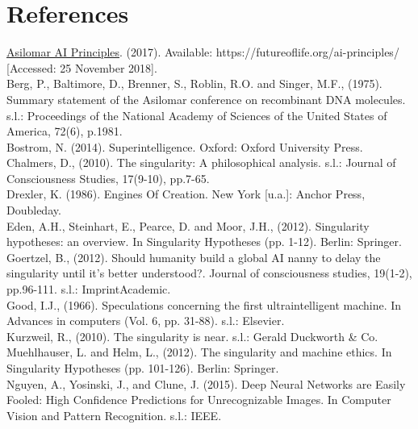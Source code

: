 \documentclass[11pt]{article}
\begin{document}
\newpage

\section*{References}

\underline{Asilomar AI Principles}. (2017). Available: https://futureoflife.org/ai-principles/ [Accessed: 25 November 2018].\\

Berg, P., Baltimore, D., Brenner, S., Roblin, R.O. and Singer, M.F., (1975). Summary statement of the Asilomar conference on recombinant DNA molecules. s.l.: Proceedings of the National Academy of Sciences of the United States of America, 72(6), p.1981.\\

Bostrom, N. (2014). Superintelligence. Oxford: Oxford University Press.\\

Chalmers, D., (2010). The singularity: A philosophical analysis. s.l.: Journal of Consciousness Studies, 17(9-10), pp.7-65.\\

Drexler, K. (1986). Engines Of Creation. New York [u.a.]: Anchor Press, Doubleday.\\

Eden, A.H., Steinhart, E., Pearce, D. and Moor, J.H., (2012). Singularity hypotheses: an overview. In Singularity Hypotheses (pp. 1-12). Berlin: Springer.\\

Goertzel, B., (2012). Should humanity build a global AI nanny to delay the singularity until it’s better understood?. Journal of consciousness studies, 19(1-2), pp.96-111. s.l.: ImprintAcademic.\\

Good, I.J., (1966). Speculations concerning the first ultraintelligent machine. In Advances in computers (Vol. 6, pp. 31-88). s.l.: Elsevier.\\

Kurzweil, R., (2010). The singularity is near. s.l.: Gerald Duckworth \& Co.\\

Muehlhauser, L. and Helm, L., (2012). The singularity and machine ethics. In Singularity Hypotheses (pp. 101-126). Berlin: Springer.\\

Nguyen, A., Yosinski, J., and Clune, J. (2015). Deep Neural Networks are Easily Fooled: High Confidence Predictions for Unrecognizable Images. In Computer Vision and Pattern Recognition. s.l.: IEEE.\\
\end{document}
